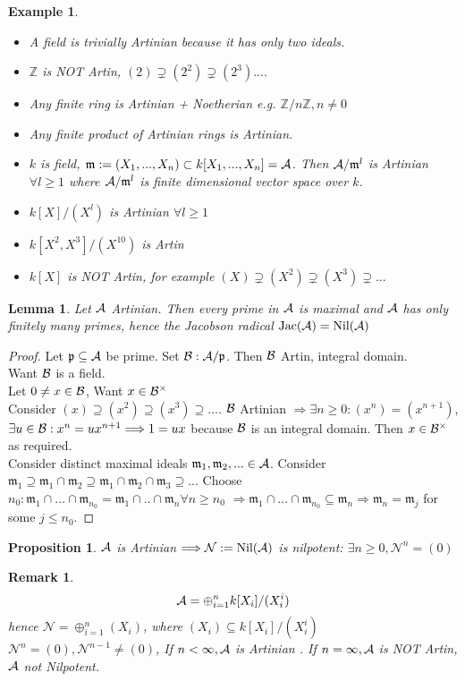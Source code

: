 \documentclass[11pt]{article}
\newtheorem{prop}[thm]{Proposition}
\newtheorem{lemma}[thm]{Lemma}
\newtheorem{rmk}[thm]{Remark}
\newtheorem{ex}[thm]{Example}
\newcommand{\intg}{\mathbb Z}
\newcommand{\scm}{{\mathfrak m}}
\newcommand{\scp}{{\mathfrak p}}
\newcommand{\cala}{{\cal A}}
\newcommand{\calb}{{\cal B}}
\newcommand{\Lrta}{\Longrightarrow}
\begin{document}
\begin{ex}\ 
\begin{itemize}
\item A field is trivially Artinian   because it has only two ideals.
\item $\intg $ is NOT Artin,
$(2)\supsetneq (2^2)\supsetneq (2^3)....$
\item Any finite ring is Artinian   + Noetherian e.g. $\intg/n\intg,n\neq 0$
\item Any finite product of Artinian  rings is Artinian. 
\item $k$ is field, $\scm:=(X_1,...,X_n)\subset k[X_1,...,X_n]=\cala$. Then $\cala/\scm^l$ is Artinian   $\forall l\geq 1$ where $\cala/\scm^l$ is finite dimensional vector space over $k$.
\item $k[X]/(X^l)$ is Artinian   $\forall l\geq 1$
\item $k[X^2,X^3]/(X^{10})$ is Artin
\item $k[X]$ is NOT Artin, for example $(X)\supsetneq (X^2)\supsetneq (X^3)\supsetneq ...$
\end{itemize}
\end{ex}

\begin{lemma}\label{lem:primes_are_maximal_in_Artin}
Let $\cala$ Artinian.  Then every prime in $\cala$ is maximal and $\cala$ has only finitely many primes, hence the Jacobson radical $\text{Jac}(\cala)=\text{Nil}(  \cala)$
\end{lemma}
\begin{proof}
Let $\scp\subseteq \cala$ be prime. Set $\calb:\cala/\scp$. Then $\calb$ Artin, integral domain.
\\
Want $\calb$ is a field.\\
Let $0\neq x\in \calb$, Want $x\in \calb^\times$\\
Consider $(x)\supseteq (x^2)\supseteq (x^3)\supseteq...$. $\calb$ Artinian   $\Lrta \exists n\geq 0: (x^n)=(x^{n+1})$, $\exists u\in \calb:x^n=u x^{n+1}\Lrta 1=ux$ because $\calb$ is an integral domain. Then $x\in\calb^{\times}$ as required.\\
Consider distinct maximal ideals $\scm_1,\scm_2,...\in\cala$. Consider $\scm_1\supseteq \scm_1\cap \scm_2\supseteq \scm_1\cap\scm_2\cap \scm_3\supseteq ...$ Choose $n_0: \scm_1\cap...\cap \scm_{n_0}=\scm_1\cap..\cap\scm_n \forall n\geq n_0$ $\Lrta \scm_1\cap...\cap\scm_{n_0}\subseteq \scm_n\Lrta \scm_n=\scm_j$ for some $j\leq n_0$.
\end{proof}

\begin{prop}\label{prop:Artin_nilpotent_nilradical}
$\cala$ is Artinian   $\Lrta \mathcal{N}:=\text{Nil}(  \cala)$ is nilpotent: $\exists n\geq 0,\mathcal{N}^n=(0)$
\end{prop}
\begin{rmk}
$$
\cala=\oplus^n_{i=1}k[X_i]/(X^i_i)
$$
hence $\mathcal{N}=\oplus^n_{i=1}(X_i)$, where $(X_i)\subseteq k[X_i]/(X^i_i)$ $\mathcal{N}^n=(0), \mathcal{N}^{n-1}\neq (0)$, If $n<\infty, \cala$ is Artinian   . If $n=\infty, \cala$ is NOT Artin, $\cala$ not Nilpotent.
\end{rmk}
\end{document}
